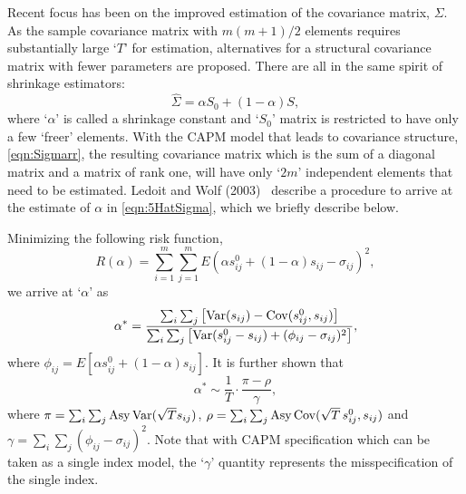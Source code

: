Recent focus has been on the improved estimation of the covariance matrix, $\Sigma$. As the sample covariance matrix with $m(m+1)/2$ elements requires substantially large `$T$' for estimation, alternatives for a structural covariance matrix with fewer parameters are proposed. There are all in the same spirit of shrinkage estimators:
	\begin{equation} \label{eqn:5HatSigma}
	\hat{\Sigma}= \alpha S_0 + (1 - \alpha) S,
	\end{equation}
where `$\alpha$' is called a shrinkage constant and `$S_0$' matrix is restricted to have only a few `freer' elements. With the CAPM model that leads to covariance structure, \eqref{eqn:Sigmarr}, the resulting covariance matrix which is the sum of a diagonal matrix and a matrix of rank one, will have only `$2m$' independent elements that need to be estimated. Ledoit and Wolf (2003)~\cite{wolf} describe a procedure to arrive at the estimate of $\alpha$ in \eqref{eqn:5HatSigma}, which we briefly describe below. 


Minimizing the following risk function,
	\begin{equation} \label{eqn:ralpha}
	R(\alpha)= \sum_{i=1}^m \sum_{j=1}^m E(\alpha s_{ij}^0 + (1-\alpha) s_{ij} - \sigma_{ij})^2,
	\end{equation}
we arrive at `$\alpha$' as
	\begin{equation}\label{eqn:bigalpha}
	\alpha^*= \dfrac{\sum_i \sum_{j} \left[ \var(s_{ij}) - \cov(s_{ij}^0, s_{ij}) \right]}{\sum_i \sum_j \left[ \var(s_{ij}^0 - s_{ij}) + (\phi_{ij} - \sigma_{ij})^2 \right]},
	\end{equation}
where $\phi_{ij}= E[\alpha s_{ij}^0 + (1 - \alpha) s_{ij}]$. It is further shown that
	\begin{equation}\label{eqn:alphastarsim}
	\alpha^* \sim \dfrac{1}{T} \cdot \dfrac{\pi - \rho}{\gamma},
	\end{equation}
where $\pi= \sum_i \sum_j \text{Asy} \operatorname{Var}(\sqrt{T} s_{ij})$, $\rho= \sum_i \sum_j \text{Asy} \operatorname{Cov}(\sqrt{T}\,s_{ij}^0, s_{ij})$ and $\gamma= \sum_i \sum_j (\phi_{ij} - \sigma_{ij})^2$. Note that with CAPM specification which can be taken as a single index model, the `$\gamma$' quantity represents the misspecification of the single index. 


